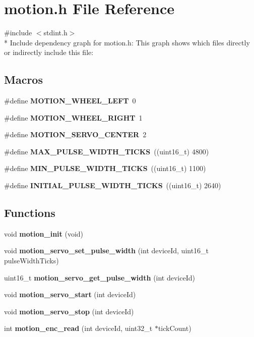 \section{motion.\+h File Reference}
\label{motion_8h}
{\ttfamily \#include $<$stdint.\+h$>$}\\*
Include dependency graph for motion.\+h\+:
This graph shows which files directly or indirectly include this file\+:
\subsection*{Macros}
\begin{DoxyCompactItemize}
\item 
\#define {\bf M\+O\+T\+I\+O\+N\+\_\+\+W\+H\+E\+E\+L\+\_\+\+L\+E\+FT}~0
\item 
\#define {\bf M\+O\+T\+I\+O\+N\+\_\+\+W\+H\+E\+E\+L\+\_\+\+R\+I\+G\+HT}~1
\item 
\#define {\bf M\+O\+T\+I\+O\+N\+\_\+\+S\+E\+R\+V\+O\+\_\+\+C\+E\+N\+T\+ER}~2
\item 
\#define {\bf M\+A\+X\+\_\+\+P\+U\+L\+S\+E\+\_\+\+W\+I\+D\+T\+H\+\_\+\+T\+I\+C\+KS}~((uint16\+\_\+t) 4800)
\item 
\#define {\bf M\+I\+N\+\_\+\+P\+U\+L\+S\+E\+\_\+\+W\+I\+D\+T\+H\+\_\+\+T\+I\+C\+KS}~((uint16\+\_\+t) 1100)
\item 
\#define {\bf I\+N\+I\+T\+I\+A\+L\+\_\+\+P\+U\+L\+S\+E\+\_\+\+W\+I\+D\+T\+H\+\_\+\+T\+I\+C\+KS}~((uint16\+\_\+t) 2640)
\end{DoxyCompactItemize}
\subsection*{Functions}
\begin{DoxyCompactItemize}
\item 
void {\bf motion\+\_\+init} (void)
\item 
void {\bf motion\+\_\+servo\+\_\+set\+\_\+pulse\+\_\+width} (int device\+Id, uint16\+\_\+t pulse\+Width\+Ticks)
\item 
uint16\+\_\+t {\bf motion\+\_\+servo\+\_\+get\+\_\+pulse\+\_\+width} (int device\+Id)
\item 
void {\bf motion\+\_\+servo\+\_\+start} (int device\+Id)
\item 
void {\bf motion\+\_\+servo\+\_\+stop} (int device\+Id)
\item 
int {\bf motion\+\_\+enc\+\_\+read} (int device\+Id, uint32\+\_\+t $\ast$tick\+Count)
\end{DoxyCompactItemize}


